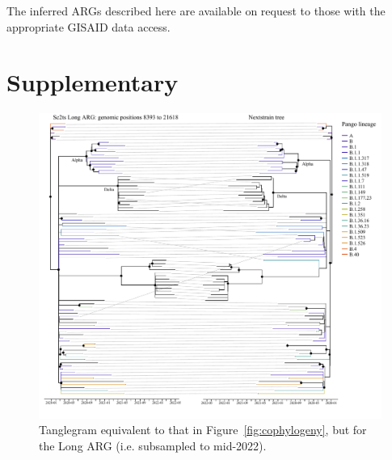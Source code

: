 \documentclass{article}
\begin{document}
The inferred ARGs described here are available on request to those with
the appropriate GISAID data access.




\clearpage
\renewcommand\thefigure{S\arabic{figure}}
\setcounter{figure}{0}
\renewcommand\thetable{S\arabic{table}}
\setcounter{table}{0}
\section*{Supplementary}

\begin{figure}[h] \centering
\includegraphics[width=\textwidth]{figures/supp_cophylogeny_long.pdf}
\caption{\label{fig:cophylogeny_long}Tanglegram equivalent to that in Figure~\ref{fig:cophylogeny},
but for the Long ARG (i.e. subsampled to mid-2022).}
\end{figure}
\end{document}

